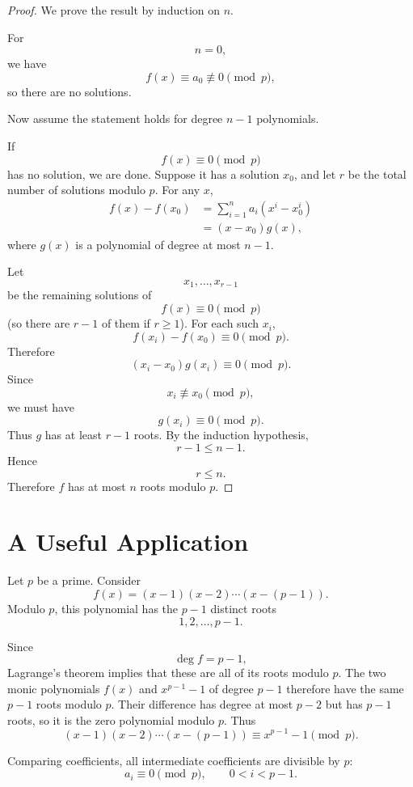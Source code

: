 \documentclass[11pt]{article}
\theoremstyle{remark}
\begin{document}
\begin{proof}
We prove the result by induction on $n$.

For
\[
    n=0,
\]
we have
\[
    f(x)\equiv a_0\not\equiv0\pmod p,
\]
so there are no solutions.

Now assume the statement holds for degree $n-1$ polynomials.

If
\[
    f(x)\equiv0\pmod p
\]
has no solution, we are done. Suppose it has a solution $x_0$, and let $r$
be the total number of solutions modulo $p$. For any $x$,
\begin{align*}
    f(x)-f(x_0)
    &=
    \sum_{i=1}^n a_i(x^i-x_0^i)\\
    &=
    (x-x_0)g(x),
\end{align*}
where $g(x)$ is a polynomial of degree at most $n-1$.

Let
\[
    x_1,\ldots,x_{r-1}
\]
be the remaining solutions of
\[
    f(x)\equiv0\pmod p
\]
(so there are $r-1$ of them if $r\ge 1$). For each such $x_i$,
\[
    f(x_i)-f(x_0)\equiv0\pmod p.
\]
Therefore
\[
    (x_i-x_0)g(x_i)\equiv0\pmod p.
\]
Since
\[
    x_i\not\equiv x_0\pmod p,
\]
we must have
\[
    g(x_i)\equiv0\pmod p.
\]
Thus $g$ has at least $r-1$ roots. By the induction hypothesis,
\[
    r-1\le n-1.
\]
Hence
\[
    r\le n.
\]
Therefore $f$ has at most $n$ roots modulo $p$.
\end{proof}

\section{A Useful Application}

Let $p$ be a prime. Consider
\[
    f(x)
    =
    (x-1)(x-2)\cdots(x-(p-1)).
\]
Modulo $p$, this polynomial has the $p-1$ distinct roots
\[
    1,2,\ldots,p-1.
\]

Since
\[
    \deg f=p-1,
\]
Lagrange's theorem implies that these are all of its roots modulo $p$.
The two monic polynomials $f(x)$ and $x^{p-1}-1$ of degree $p-1$ therefore
have the same $p-1$ roots modulo $p$. Their difference has degree at most
$p-2$ but has $p-1$ roots, so it is the zero polynomial modulo $p$. Thus
\[
    \boxed{
    (x-1)(x-2)\cdots(x-(p-1))
    \equiv
    x^{p-1}-1
    \pmod p.
    }
\]

Comparing coefficients, all intermediate coefficients are divisible by
$p$:
\[
    \boxed{
    a_i\equiv0\pmod p,
    \qquad
    0<i<p-1.
    }
\]
\end{document}
